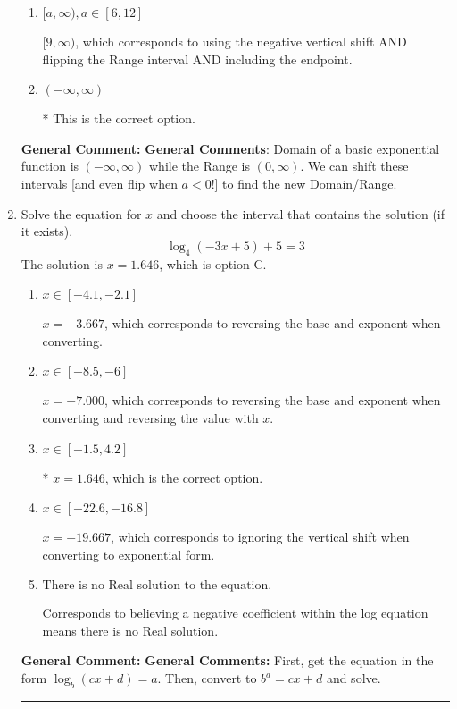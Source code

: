 \documentclass{extbook}[14pt]
\newcommand{\litem}[1]{\item #1

\rule{\textwidth}{0.4pt}}
\begin{document}
\begin{enumerate}
{\begin{enumerate}[label=\Alph*.]
$(-\infty, -9)$, which corresponds to using the correct vertical shift *if we wanted the Range*.
\item \( [a, \infty), a \in [6, 12] \)

$[9, \infty)$, which corresponds to using the negative vertical shift AND flipping the Range interval AND including the endpoint.
\item \( (-\infty, \infty) \)

* This is the correct option.
\end{enumerate}

\textbf{General Comment:} \textbf{General Comments}: Domain of a basic exponential function is $(-\infty, \infty)$ while the Range is $(0, \infty)$. We can shift these intervals [and even flip when $a<0$!] to find the new Domain/Range.
}
\litem{
Solve the equation for $x$ and choose the interval that contains the solution (if it exists).
\[ \log_{4}{(-3x+5)}+5 = 3 \]The solution is \( x = 1.646 \), which is option C.\begin{enumerate}[label=\Alph*.]
\item \( x \in [-4.1, -2.1] \)

$x = -3.667$, which corresponds to reversing the base and exponent when converting.
\item \( x \in [-8.5, -6] \)

$x = -7.000$, which corresponds to reversing the base and exponent when converting and reversing the value with $x$.
\item \( x \in [-1.5, 4.2] \)

* $x = 1.646$, which is the correct option.
\item \( x \in [-22.6, -16.8] \)

$x = -19.667$, which corresponds to ignoring the vertical shift when converting to exponential form.
\item \( \text{There is no Real solution to the equation.} \)

Corresponds to believing a negative coefficient within the log equation means there is no Real solution.
\end{enumerate}

\textbf{General Comment:} \textbf{General Comments:} First, get the equation in the form $\log_b{(cx+d)} = a$. Then, convert to $b^a = cx+d$ and solve.
}
\end{enumerate}
\end{document}
